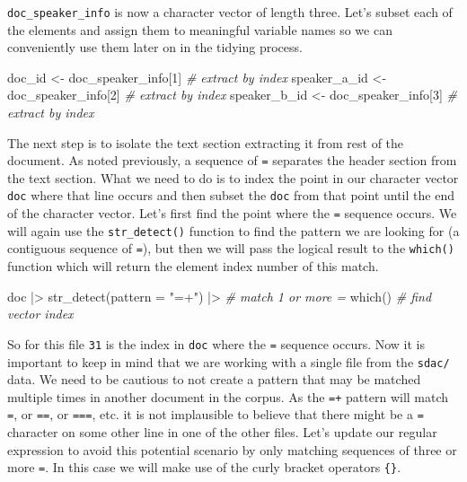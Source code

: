\documentclass[
  letterpaper,
  DIV=11,
  numbers=noendperiod]{scrreport}
\newenvironment{Shaded}{\begin{snugshade}}{\end{snugshade}}
\newcommand{\AttributeTok}[1]{\textcolor[rgb]{0.00,0.00,0.00}{#1}}
\newcommand{\CommentTok}[1]{\textcolor[rgb]{0.00,0.00,0.00}{\textit{#1}}}
\newcommand{\DecValTok}[1]{\textcolor[rgb]{0.00,0.00,0.00}{#1}}
\newcommand{\FunctionTok}[1]{\textcolor[rgb]{0.00,0.00,0.00}{#1}}
\newcommand{\NormalTok}[1]{\textcolor[rgb]{0.00,0.00,0.00}{#1}}
\newcommand{\OtherTok}[1]{\textcolor[rgb]{0.00,0.00,0.00}{#1}}
\newcommand{\SpecialCharTok}[1]{\textcolor[rgb]{0.00,0.00,0.00}{#1}}
\newcommand{\StringTok}[1]{\textcolor[rgb]{0.00,0.00,0.00}{#1}}
\theoremstyle{definition}
\theoremstyle{remark}
\begin{document}
\texttt{doc\_speaker\_info} is now a character vector of length three.
Let's subset each of the elements and assign them to meaningful variable
names so we can conveniently use them later on in the tidying process.

\begin{Shaded}
\begin{Highlighting}[]
\NormalTok{doc\_id }\OtherTok{\textless{}{-}}\NormalTok{ doc\_speaker\_info[}\DecValTok{1}\NormalTok{] }\CommentTok{\# extract by index}
\NormalTok{speaker\_a\_id }\OtherTok{\textless{}{-}}\NormalTok{ doc\_speaker\_info[}\DecValTok{2}\NormalTok{] }\CommentTok{\# extract by index}
\NormalTok{speaker\_b\_id }\OtherTok{\textless{}{-}}\NormalTok{ doc\_speaker\_info[}\DecValTok{3}\NormalTok{] }\CommentTok{\# extract by index}
\end{Highlighting}
\end{Shaded}

The next step is to isolate the text section extracting it from rest of
the document. As noted previously, a sequence of \texttt{=} separates
the header section from the text section. What we need to do is to index
the point in our character vector \texttt{doc} where that line occurs
and then subset the \texttt{doc} from that point until the end of the
character vector. Let's first find the point where the \texttt{=}
sequence occurs. We will again use the \texttt{str\_detect()} function
to find the pattern we are looking for (a contiguous sequence of
\texttt{=}), but then we will pass the logical result to the
\texttt{which()} function which will return the element index number of
this match.

\begin{Shaded}
\begin{Highlighting}[]
\NormalTok{doc }\SpecialCharTok{|\textgreater{}}
  \FunctionTok{str\_detect}\NormalTok{(}\AttributeTok{pattern =} \StringTok{"=+"}\NormalTok{) }\SpecialCharTok{|\textgreater{}} \CommentTok{\# match 1 or more \textasciigrave{}=\textasciigrave{}}
  \FunctionTok{which}\NormalTok{() }\CommentTok{\# find vector index}
\end{Highlighting}
\end{Shaded}

So for this file \texttt{31} is the index in \texttt{doc} where the
\texttt{=} sequence occurs. Now it is important to keep in mind that we
are working with a single file from the \texttt{sdac/} data. We need to
be cautious to not create a pattern that may be matched multiple times
in another document in the corpus. As the \texttt{=+} pattern will match
\texttt{=}, or \texttt{==}, or \texttt{===}, etc. it is not implausible
to believe that there might be a \texttt{=} character on some other line
in one of the other files. Let's update our regular expression to avoid
this potential scenario by only matching sequences of three or more
\texttt{=}. In this case we will make use of the curly bracket operators
\texttt{\{\}}.
\end{document}
